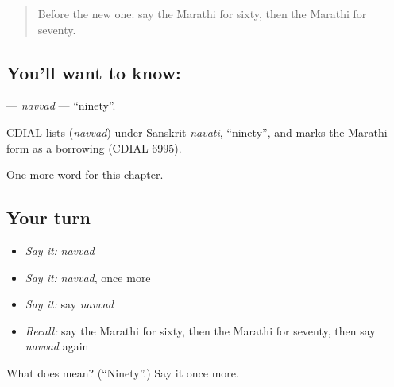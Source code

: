 \label{lesson:MR-C118-navvad}



\begin{quote}
Before the new one: say the Marathi for sixty, then the Marathi for seventy.
\end{quote}

\subsection*{You'll want to know: }
\textbf{} — \emph{navvad} — \textquotedblleft{}ninety\textquotedblright{}.

\begin{cousinweb}
CDIAL lists \textbf{} (\emph{navvad}) under Sanskrit \emph{navati}, \textquotedblleft{}ninety\textquotedblright{}, and marks the Marathi form as a borrowing (CDIAL 6995).
\end{cousinweb}

\begin{grammarlens}[title={What you've built}]
One more word for this chapter.
\end{grammarlens}

\subsection*{Your turn}
\begin{itemize}
\raggedright
  \item \emph{Say it:} \emph{navvad}
  \item \emph{Say it:} \emph{navvad}, once more
  \item \emph{Say it:} say \emph{navvad}
  \item \emph{Recall:} say the Marathi for sixty, then the Marathi for seventy, then say \emph{navvad} again
\end{itemize}

\begin{tcolorbox}[breakable,colback=teal!4,colframe=teal!35!black,title={Before you move on}]
What does  mean? (\textquotedblleft{}Ninety\textquotedblright{}.) Say it once more.
\end{tcolorbox}
